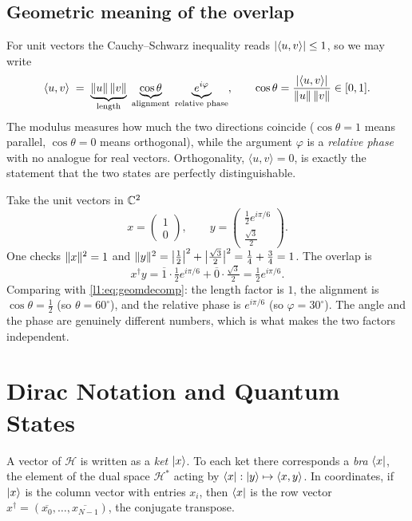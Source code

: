 \subsection{Geometric meaning of the overlap}

For unit vectors the Cauchy--Schwarz inequality reads $\lvert\langle u,v\rangle\rvert\le1$,
so we may write
\begin{equation}\label{l1:eq:geomdecomp}
  \langle u,v\rangle \;=\; \underbrace{\lVert u\rVert\,\lVert v\rVert}_{\text{length}}\;
  \underbrace{\cos\theta}_{\text{alignment}}\;\underbrace{e^{i\varphi}}_{\text{relative phase}},
  \qquad \cos\theta=\frac{\lvert\langle u,v\rangle\rvert}{\lVert u\rVert\,\lVert v\rVert}\in[0,1].
\end{equation}
The modulus measures how much the two directions coincide ($\cos\theta=1$ means
parallel, $\cos\theta=0$ means orthogonal), while the argument $\varphi$ is a
\emph{relative phase} with no analogue for real vectors. Orthogonality,
$\langle u,v\rangle=0$, is exactly the statement that the two states are perfectly
distinguishable.

\begin{example}\label{l1:ex:overlap}
Take the unit vectors in $\mathbb{C}^{2}$
\[
  x=\begin{pmatrix}1\\[2pt]0\end{pmatrix},\qquad
  y=\begin{pmatrix}\tfrac{1}{2}e^{i\pi/6}\\[3pt]\tfrac{\sqrt3}{2}\end{pmatrix}.
\]
One checks $\lVert x\rVert^{2}=1$ and $\lVert y\rVert^{2}=\bigl|\tfrac12\bigr|^{2}+\bigl|\tfrac{\sqrt3}{2}\bigr|^{2}=\tfrac14+\tfrac34=1$.
The overlap is
\[
  x^{\dagger}y=\overline{1}\cdot\tfrac12 e^{i\pi/6}+\overline{0}\cdot\tfrac{\sqrt3}{2}
             =\tfrac12 e^{i\pi/6}.
\]
Comparing with \eqref{l1:eq:geomdecomp}: the length factor is $1$, the alignment is
$\cos\theta=\tfrac12$ (so $\theta=60^{\circ}$), and the relative phase is
$e^{i\pi/6}$ (so $\varphi=30^{\circ}$). The angle and the phase are genuinely
different numbers, which is what makes the two factors independent.
\end{example}

\section{Dirac Notation and Quantum States}

\begin{definition}\label{l1:def:braket}
A vector of $\mathcal{H}$ is written as a \emph{ket} $\ket{x}$. To each ket there
corresponds a \emph{bra} $\bra{x}$, the element of the dual space
$\mathcal{H}^{*}$ acting by $\bra{x}:\ket{y}\mapsto\langle x,y\rangle$. In
coordinates, if $\ket{x}$ is the column vector with entries $x_i$, then $\bra{x}$
is the row vector $x^{\dagger}=(\overline{x_0},\dots,\overline{x_{N-1}})$, the
conjugate transpose.
\end{definition}


